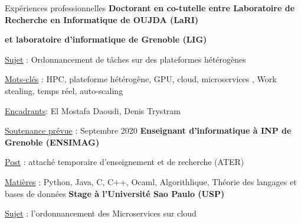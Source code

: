 
\begin{rubric}{Expériences professionnelles}
%
%
%
\entry*[]
    \textbf{Doctorant en co-tutelle entre Laboratoire de Recherche en Informatique de OUJDA (LaRI)} 
        \hfill {}
    \par \textbf{et laboratoire d'informatique de Grenoble (LIG)} 
    \par \underline{Sujet} : Ordonnancement de tâches sur des plateformes hétérogènes
    \par \underline{Mots-clés} : HPC, plateforme hétérogène, GPU, cloud, microservices , Work stealing, temps réel, auto-scaling
    \par \underline{Encadrants}:  El Mostafa Daoudi, Denis Trystram
    \par \underline{Soutenance prévue} : Septembre 2020
%
%
\entry*[]
    \textbf{Enseignant d'informatique à INP de Grenoble (ENSIMAG)} 
     \hfill {} 
    \par \underline{Post} : attaché temporaire d'enseignement et de recherche (ATER)
        \hfill {}
    \par \underline{Matières} : Python, Java, C, C++, Ocaml, Algorithlique, Théorie des langages et bases de données%
        \hfill {}
\entry*[]
    \textbf{Stage à l'Université Sao Paulo (USP)} %
     \hfill{} 
    \par \underline{Sujet} : l'ordonnancement des Microservices sur cloud

\end{rubric}
